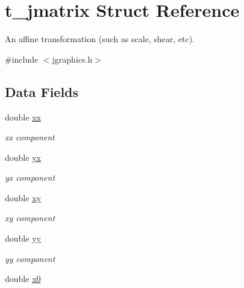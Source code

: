 \hypertarget{structt__jmatrix}{
\section{t\_\-jmatrix Struct Reference}
\label{structt__jmatrix}
}


An affine transformation (such as scale, shear, etc).  


{\ttfamily \#include $<$jgraphics.h$>$}\subsection*{Data Fields}
\begin{DoxyCompactItemize}
\item 
\hypertarget{structt__jmatrix_a29290e7f05f04a5400af71b8446b7ee9}{
double \hyperlink{structt__jmatrix_a29290e7f05f04a5400af71b8446b7ee9}{xx}}
\label{structt__jmatrix_a29290e7f05f04a5400af71b8446b7ee9}

\begin{DoxyCompactList}\small\item\em xx component \item\end{DoxyCompactList}\item 
\hypertarget{structt__jmatrix_a093abb2306917cadf3c6451ae830bd0a}{
double \hyperlink{structt__jmatrix_a093abb2306917cadf3c6451ae830bd0a}{yx}}
\label{structt__jmatrix_a093abb2306917cadf3c6451ae830bd0a}

\begin{DoxyCompactList}\small\item\em yx component \item\end{DoxyCompactList}\item 
\hypertarget{structt__jmatrix_a9ec039fd31437fe0f1942860aaac65d7}{
double \hyperlink{structt__jmatrix_a9ec039fd31437fe0f1942860aaac65d7}{xy}}
\label{structt__jmatrix_a9ec039fd31437fe0f1942860aaac65d7}

\begin{DoxyCompactList}\small\item\em xy component \item\end{DoxyCompactList}\item 
\hypertarget{structt__jmatrix_a72a06e5fc831f59dc7d9c05998de0407}{
double \hyperlink{structt__jmatrix_a72a06e5fc831f59dc7d9c05998de0407}{yy}}
\label{structt__jmatrix_a72a06e5fc831f59dc7d9c05998de0407}

\begin{DoxyCompactList}\small\item\em yy component \item\end{DoxyCompactList}\item 
\hypertarget{structt__jmatrix_a891b939bc96d8da496d91969fb713c3f}{
double \hyperlink{structt__jmatrix_a891b939bc96d8da496d91969fb713c3f}{x0}}
\label{structt__jmatrix_a891b939bc96d8da496d91969fb713c3f}


\end{DoxyCompactItemize}
